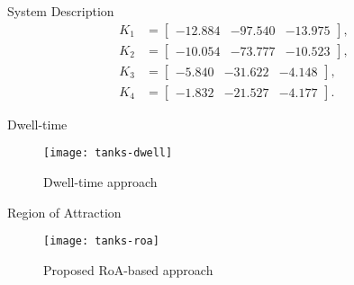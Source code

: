 \begin{slide}{System Description}
  \begin{equation}
    \begin{aligned}
      K_{1} & = \begin{bmatrix} -12.884 & -97.540 & -13.975 \end{bmatrix}, \\
      K_{2} & = \begin{bmatrix} -10.054 & -73.777 & -10.523 \end{bmatrix}, \\
      K_{3} & = \begin{bmatrix} -5.840  & -31.622 & -4.148 \end{bmatrix}, \\
      K_{4} & = \begin{bmatrix} -1.832  & -21.527 & -4.177 \end{bmatrix}.
    \end{aligned}
  \end{equation}
\end{slide}

\begin{slide}{Dwell-time}
  \begin{figure}[ht!]
    \centering \captionsetup{justification=centering}
    \texttt{[image: tanks-dwell]}
    \caption{Dwell-time approach}%
    \label{fig:tanks-dwell}
  \end{figure}
\end{slide}

\begin{slide}{Region of Attraction}
  \begin{figure}[ht!]
    \centering \captionsetup{justification=centering}
    \texttt{[image: tanks-roa]}
    \caption{Proposed RoA-based approach}%
    \label{fig:tanks-roa}
  \end{figure}
\end{slide}
